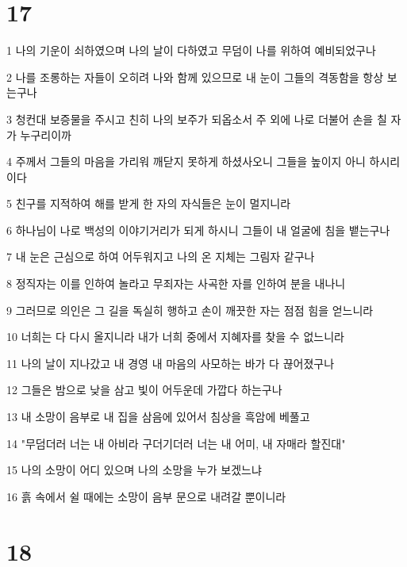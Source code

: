 \chapter{17}

\par 1 나의 기운이 쇠하였으며 나의 날이 다하였고 무덤이 나를 위하여 예비되었구나
\par 2 나를 조롱하는 자들이 오히려 나와 함께 있으므로 내 눈이 그들의 격동함을 항상 보는구나
\par 3 청컨대 보증물을 주시고 친히 나의 보주가 되옵소서 주 외에 나로 더불어 손을 칠 자가 누구리이까
\par 4 주께서 그들의 마음을 가리워 깨닫지 못하게 하셨사오니 그들을 높이지 아니 하시리이다
\par 5 친구를 지적하여 해를 받게 한 자의 자식들은 눈이 멀지니라
\par 6 하나님이 나로 백성의 이야기거리가 되게 하시니 그들이 내 얼굴에 침을 뱉는구나
\par 7 내 눈은 근심으로 하여 어두워지고 나의 온 지체는 그림자 같구나
\par 8 정직자는 이를 인하여 놀라고 무죄자는 사곡한 자를 인하여 분을 내나니
\par 9 그러므로 의인은 그 길을 독실히 행하고 손이 깨끗한 자는 점점 힘을 얻느니라
\par 10 너희는 다 다시 올지니라 내가 너희 중에서 지혜자를 찾을 수 없느니라
\par 11 나의 날이 지나갔고 내 경영 내 마음의 사모하는 바가 다 끊어졌구나
\par 12 그들은 밤으로 낮을 삼고 빛이 어두운데 가깝다 하는구나
\par 13 내 소망이 음부로 내 집을 삼음에 있어서 침상을 흑암에 베풀고
\par 14 "무덤더러 너는 내 아비라 구더기더러 너는 내 어미, 내 자매라 할진대"
\par 15 나의 소망이 어디 있으며 나의 소망을 누가 보겠느냐
\par 16 흙 속에서 쉴 때에는 소망이 음부 문으로 내려갈 뿐이니라

\chapter{18}

